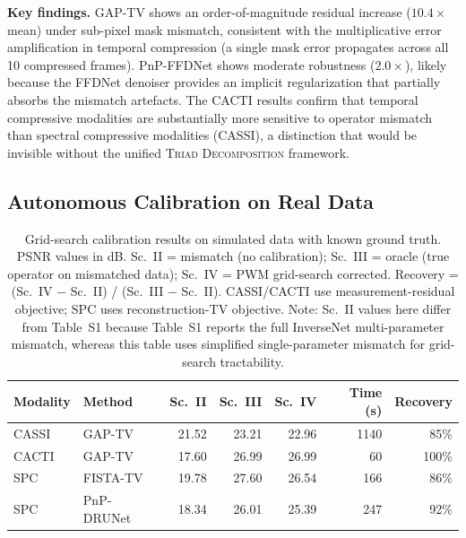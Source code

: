 \documentclass[11pt]{article}
\theoremstyle{definition}
\begin{document}
\noindent\textbf{Key findings.}
GAP-TV shows an order-of-magnitude residual increase ($10.4\times$ mean)
under sub-pixel mask mismatch, consistent with the multiplicative error
amplification in temporal compression (a single mask error propagates
across all 10 compressed frames).  PnP-FFDNet shows moderate robustness
($2.0\times$), likely because the FFDNet denoiser provides an implicit
regularization that partially absorbs the mismatch artefacts.  The CACTI
results confirm that temporal compressive modalities are substantially
more sensitive to operator mismatch than spectral compressive modalities
(CASSI), a distinction that would be invisible without the unified
\textsc{Triad Decomposition} framework.


\subsection{Autonomous Calibration on Real Data}

\begin{table}[htbp]
\centering
\caption{Grid-search calibration results on
simulated data with known ground truth.  PSNR values in dB.
Sc.~II = mismatch (no calibration); Sc.~III = oracle (true operator on mismatched data);
Sc.~IV = PWM grid-search corrected.
Recovery = (Sc.~IV $-$ Sc.~II) / (Sc.~III $-$ Sc.~II).
CASSI/CACTI use measurement-residual objective; SPC uses
reconstruction-TV objective.  Note: Sc.~II values here differ from Table~S1 because Table~S1 reports the full InverseNet multi-parameter mismatch, whereas this table uses simplified single-parameter mismatch for grid-search tractability.}
\label{tab:scenario_iv}
\begin{tabular}{l l r r r r r}
\toprule
\textbf{Modality} & \textbf{Method} &
  \textbf{Sc.~II} & \textbf{Sc.~III} & \textbf{Sc.~IV} &
  \textbf{Time (s)} & \textbf{Recovery} \\
\midrule
CASSI  & GAP-TV     & 21.52 & 23.21 & 22.96 & 1140 & 85\% \\
CACTI  & GAP-TV     & 17.60 & 26.99 & 26.99 &   60 & 100\% \\
SPC    & FISTA-TV   & 19.78 & 27.60 & 26.54 &  166 &  86\% \\
SPC    & PnP-DRUNet & 18.34 & 26.01 & 25.39 &  247 &  92\% \\
\bottomrule
\end{tabular}
\end{table}
\end{document}
